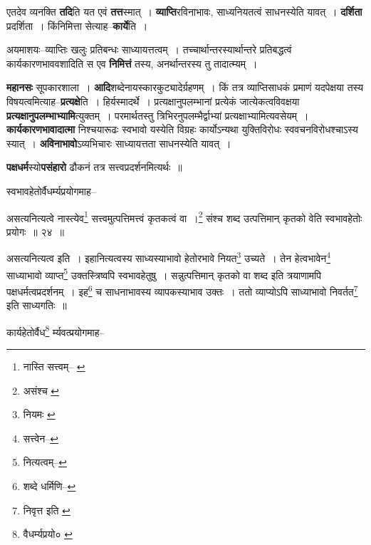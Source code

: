 \documentclass[article,12pt,a4paper]{memoir}
\begin{document}
	  \pstart एतदेव व्यनक्ति \textbf{तदि}ति यत एवं \textbf{तत्त}स्मात् । \textbf{व्याप्ति}रविनाभावः, साध्यनियतत्वं साधनस्येति यावत् । \textbf{दर्शिता} प्रदर्शिता । किंनिमित्ता सेत्याह--\textbf{कार्ये}ति ।
	\pend
      

	  \pstart अयमाशयः--व्याप्तिः खलुः प्रतिबन्धः साध्यायत्तत्वम् । तच्चार्थान्तरस्यार्थान्तरे प्रतिबद्धत्वं कार्यकारणभाववशादिति स एव \textbf{निमित्तं} तस्य, अनर्थान्तरस्य तु तादा\leavevmode{}त्म्यम् ।
	\pend
      

	  \pstart \textbf{महानसः} सूपकारशाला । \textbf{आदि}शब्देनायस्कारकुट्यादेर्ग्रहणम् । किं तत्र व्याप्तिसाधकं प्रमाणं यदपेक्षया तस्य विषयत्वमित्याह--\textbf{प्रत्यक्षे}ति । हिर्यस्मादर्थे । प्रत्यक्षानुपलम्भानां प्रत्येकं जात्येकत्वविवक्षया \textbf{प्रत्यक्षानुपलम्भाभ्यामि}त्युक्तम् । परमार्थतस्तु त्रिभिरनुपलम्भैर्द्वाभ्यां प्रत्यक्षाभ्यामित्यवसेयम् । \textbf{कार्यकारणभावादात्मा} निश्चयारूढः स्वभावो यस्येति विग्रहः कार्योऽन्यथा युक्तिविरोधः स्ववचनविरोधश्चाऽस्य स्यात् । \textbf{अविनाभावो}ऽव्यभिचारः साध्यायत्तता साधनस्येति यावत् ।
	\pend
      

	  \pstart \textbf{पक्षधर्म}स्यो\textbf{पसंहारो} ढौकनं तत्र सत्त्वप्रदर्शनमित्यर्थः ॥
	\pend
	  \bigskip
	  \begingroup
	

	  \pstart स्वभावहेतोर्वैधर्म्यप्रयोगमाह--
	\pend
       
	  \bigskip
	  \begingroup
	

	  \pstart असत्यनित्यत्वे नास्त्येव\footnote{नास्ति सत्त्वम्--\cite{dp-msB} \cite{dp-msD} \cite{dp-edP} \cite{dp-edH} \cite{dp-edE} \cite{dp-edN}} सत्त्वमुत्पत्तिमत्त्वं कृतकत्वं वा ।\footnote{असंश्च \cite{dp-msB} \cite{dp-edP} \cite{dp-edH} \cite{dp-edN}} संश्च शब्द उत्पत्तिमान् कृतको वेति स्वभावहेतोः प्रयोगः ॥ २४ ॥
	\pend
      
	  \endgroup
	 

	  \pstart असत्यनित्यत्व इति । इहानित्यत्वस्य साध्यस्याभावो हेतोरभावे नियत\footnote{नियमः \cite{dp-msB}} उच्यते । तेन हेत्वभावेन\footnote{सत्त्वेन--\cite{dp-msD-n}} साध्याभावो व्याप्त\footnote{नित्यत्वम्--\cite{dp-msD-n}} उक्तस्त्रिष्वपि स्वभावहेतुषु । सन्नुत्पत्तिमान् कृतको वा शब्द इति त्रयाणामपि पक्षधर्मत्वप्रदर्शनम् । इह\footnote{शब्दे धर्मिणि--\cite{dp-msD-n}} च साधनाभावस्य व्यापकस्याभाव उक्तः । ततो व्याप्योऽपि साध्याभावो निवर्तत\footnote{निवृत्त इति \cite{dp-msA} \cite{dp-edP} \cite{dp-edH} \cite{dp-edE} \cite{dp-edN}} इति साध्यगतिः ॥
	\pend
       

	  \pstart कार्यहेतोर्वैध\footnote{वैधर्म्यप्रयो० \cite{dp-msA} \cite{dp-edP} \cite{dp-edH} \cite{dp-edE} \cite{dp-edN}} र्म्यवत्प्रयोगमाह--
	\pend
       
\end{document}

